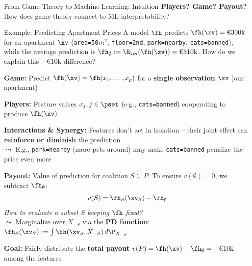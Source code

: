\documentclass[10pt,compress,t,notes=noshow, xcolor=table]{beamer}
\begin{document}
\begin{framev}[fs=small,align=top]{From Game Theory to Machine Learning: Intuition}
\textbf{Players? Game? Payout?} How does game theory connect to ML interpretability?

\pause
\begin{exampleblock}{Example: Predicting Apartment Prices}
A model $\fh$ predicts $\fh(\xv) = \text{€}300\text{k}$ for an apartment $\xv$ (\texttt{area=50$m^2$}, \texttt{floor=2nd}, \texttt{park=nearby}, \texttt{cats=banned}), while the average prediction is $\fh_{\emptyset} := \E_{\xv}(\fh(\xv)) = \text{€}310\text{k}$. How do we explain this $-\text{€}10\text{k}$ difference?
\end{exampleblock}

\pause
\spacer[0.15]
\begin{itemizeS}
\item \textbf{Game:} Predict $\fh(\xv) = \fh(x_1, \ldots, x_p)$ for a \textbf{single observation} $\xv$ (our apartment)
\pause
\item \textbf{Players:} Feature values $x_j, j \in \pset$ (e.g., \texttt{cats=banned}) cooperating to produce $\fh(\xv)$
\pause
\item \textbf{Interactions \& Synergy:} Features don't act in isolation -- their joint effect can \textbf{reinforce or diminish} the prediction\\
$\leadsto$ E.g., \texttt{park=nearby} (more pets around) may make \texttt{cats=banned} penalize the price even more
\pause
\item \textbf{Payout:} Value of prediction for coalition $S \subseteq P$. To ensure $v(\emptyset) = 0$, we subtract $\fh_{\emptyset}$:
$$
v(S) = \fh_S(\xv_S) - \fh_{\emptyset}
$$
\pause
\textit{How to evaluate a subset $S$ keeping $\fh$ fixed?}\\
$\leadsto$ Marginalize over $X_{-S}$ via the \textbf{PD function}: $\fh_S(\xv_S) := \int \fh(\xv_S, X_{-S}) \, d\P_{X_{-S}}$
\pause
\item \textbf{Goal:} Fairly distribute the \textbf{total payout} $v(P) = \fh(\xv) - \fh_{\emptyset} = -\text{€}10\text{k}$ among the features
\end{itemizeS}
\end{framev}
\end{document}
